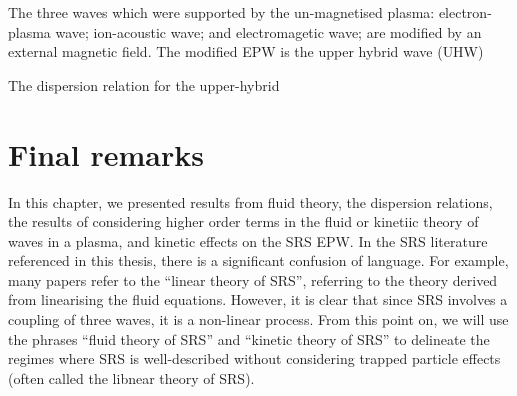 The three waves which were supported by the un-magnetised plasma: electron-plasma wave; ion-acoustic wave; and electromagetic wave; are modified by an external magnetic field. The modified \acrshort{EPW} is the upper hybrid wave (\acrshort{UHW})

The dispersion relation for the upper-hybrid 

\section{Final remarks}
In this chapter, we presented results from fluid theory, the dispersion relations, the results of considering higher order terms in the fluid or kinetiic theory of waves in a plasma, and kinetic effects on the SRS EPW. In the SRS literature referenced in this thesis, there is a significant confusion of language. For example, many papers refer to the ``linear theory of SRS'', referring to the theory derived from linearising the fluid equations. However, it is clear that since SRS involves a coupling of three waves, it is a non-linear process. From this point on, we will use the phrases ``fluid theory of SRS'' and ``kinetic theory of SRS'' to delineate the regimes where SRS is well-described without considering trapped particle effects (often called the libnear theory of SRS).

%
%
